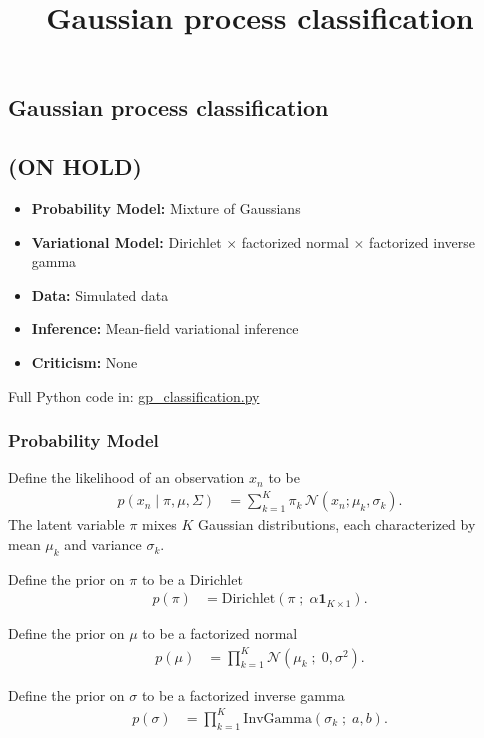 \title{Gaussian process classification}

\subsection{Gaussian process classification}

\subsection{(ON HOLD)}

\begin{itemize}
  \item \textbf{Probability Model:} Mixture of Gaussians
  \item \textbf{Variational Model:} Dirichlet $\times$ factorized normal
  $\times$ factorized inverse gamma
  \item \textbf{Data:} Simulated data
  \item \textbf{Inference:} Mean-field variational inference
  \item \textbf{Criticism:} None
\end{itemize}

Full Python code in: 
\href{https://github.com/blei-lab/edward/blob/master/examples/gp_classification.py}
{gp_classification.py}


\subsubsection{Probability Model}
Define the likelihood of an observation $x_n$
to be
\begin{align*}
  p(x_{n} \mid \pi, \mu, \Sigma)
  &=
  \sum_{k=1}^K \pi_k \, \mathcal{N}(x_n ; \mu_k, \sigma_k).
\end{align*}
The latent variable $\pi$ mixes $K$ Gaussian distributions, each 
characterized by mean $\mu_k$ and variance $\sigma_k$.

Define the prior on $\pi$ to be a Dirichlet 
\begin{align*}
  p(\pi)
  &=
  \text{Dirichlet}(\pi \;;\; \alpha \mathbf{1}_{K \times 1}).
\end{align*} 

Define the prior on $\mu$ to be a factorized normal 
\begin{align*}
  p(\mu)
  &=
  \prod_{k=1}^{K} \mathcal{N}(\mu_k \;;\; 0, \sigma^2).
\end{align*} 

Define the prior on $\sigma$ to be a factorized inverse gamma
\begin{align*}
  p(\sigma)
  &=
  \prod_{k=1}^{K} \text{InvGamma}(\sigma_k \;;\; a, b).
\end{align*} 

